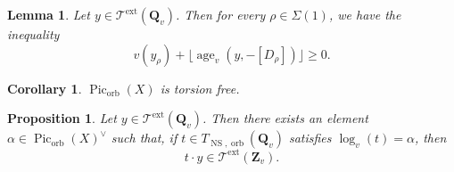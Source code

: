 \documentclass[10pt,a4paper]{amsart}
\newtheorem{prop}{Proposition}
\newtheorem{lemma}{Lemma}
\newtheorem{cor}{Corollary}
\DeclareMathOperator{\NS}{NS}
\DeclareMathOperator{\Pic}{Pic}
\newcommand{\Q}{\mathbf{Q}}
\newcommand{\Z}{\mathbf{Z}}
\DeclareMathOperator{\age}{age}
\DeclareMathOperator{\ext}{ext}
\DeclareMathOperator{\orb}{orb}
\newcommand{\stackT}{\mathcal{T}}
\begin{document}
\begin{lemma}\label{lemma_inequality_valuation_plus_age}
Let $y \in \stackT^{\ext}(\Q_v)$. Then for every $\rho \in \Sigma(1)$, we have the inequality
\[
v(y_{\rho}) + \lfloor \age_v(y,-[D_{\rho}]) \rfloor \geqslant 0 .
\]
\end{lemma}

\begin{cor}\label{corollaire_orbifold_picard_group_torsion_free}
    $\Pic_{\orb}(X)$ is torsion free.
\end{cor}

\begin{prop}\label{prop_surjectivite_local_extended_quotient_description}
Let $y \in \stackT^{\ext}(\Q_v)$. Then there exists an element
$\alpha \in \Pic_{\orb}(X)^{\vee}$ such that, if
$t \in T_{\NS,\orb}(\Q_v)$ satisfies $\log_v(t) = \alpha$, then
\[
t \cdot y \in \stackT^{\ext}(\Z_v).
\]
\end{prop}
\end{document}
